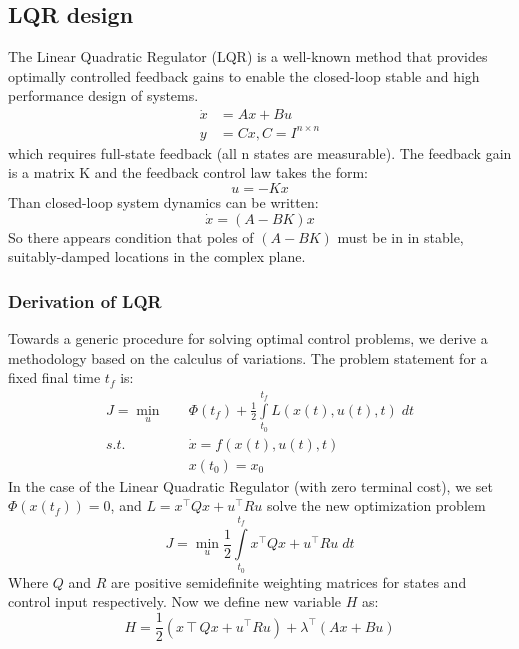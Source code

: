 \subsection{LQR design}
The Linear Quadratic Regulator (LQR) is a well-known method that provides optimally controlled feedback gains to enable the closed-loop stable and high performance design of systems.
\begin{equation}
\begin{split}
\dot{x} &= Ax + Bu\\
y &= Cx, C=I^{n \times n}
\end{split}
\end{equation}
which requires  full-state feedback (all n states are measurable).
The feedback gain is a matrix K and the feedback control law takes the form:
\begin{equation}
	u = -Kx
\end{equation}
Than closed-loop system dynamics can be written:
\begin{equation}
\dot{x} = (A-BK)x
\end{equation}
So there appears condition that poles of $(A-BK)$ must be in in stable, suitably-damped locations in the complex plane.
\subsubsection{Derivation of LQR}
Towards a generic procedure for solving optimal control problems, we derive a methodology based on the calculus of variations. The problem statement for a fixed final time $t_f$ is:
\begin{equation}
\begin{split}
	J = \min_{u}& \quad \Phi(t_f)+\frac{1}{2}\int\limits_{t_0}^{t_f}L(x(t),u(t),t)\;dt\\
	s.t.&\quad  \dot{x} = f(x(t),u(t),t)\\
	& \quad x(t_0) = x_0
	\end{split}
\end{equation}
In the case of the Linear Quadratic Regulator (with zero terminal cost), we set  $\Phi(x(t_f))=0$, and $L = x^\intercal Qx+u^\intercal Ru$ solve the new optimization problem
\begin{equation}
J=\min_{u}  \frac{1}{2}\int\limits_{t_0}^{t_f}x^\intercal Qx+u^\intercal Ru\;dt
\end{equation}
Where $Q$ and $R$ are positive semidefinite weighting matrices for states and control input respectively.
Now we define new variable $H$ as:
\begin{equation}
H = \frac{1}{2}(x\intercal Qx + u^\intercal Ru)+\lambda^\intercal(Ax + Bu)
\end{equation}

